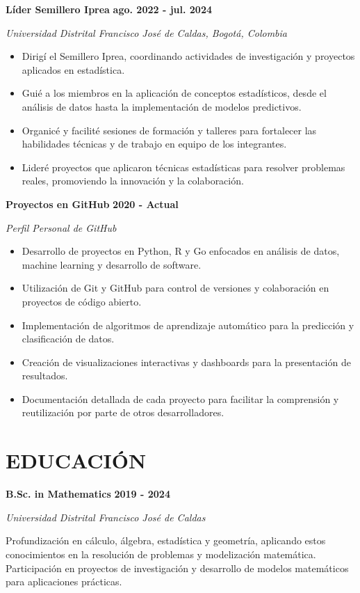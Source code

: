 \documentclass[paper=a4,fontsize=11pt]{scrartcl} %
\newcommand{\sepspace}{\vspace*{0.8em}}
\newcommand{\NewPart}[1]{\section*{\uppercase{#1}}}
\newcommand{\EducationEntry}[4]{%
  \noindent \textbf{#1} \hfill \textbf{#2} \par
  \noindent \textit{#3} \par
  \noindent \small #4 
  \normalsize \par \sepspace
}
\newcommand{\WorkEntry}[4]{%
  \noindent \textbf{#1} \hfill \textbf{#2} \par
  \noindent \textit{#3} \par
  \noindent \small #4 
  \normalsize \par \sepspace
}
\begin{document}
\WorkEntry{Líder Semillero Iprea}{ago. 2022 - jul. 2024}{Universidad Distrital Francisco José de Caldas, Bogotá, Colombia}{%
\begin{itemize}[leftmargin=*, noitemsep]
    \item Dirigí el Semillero Iprea, coordinando actividades de investigación y proyectos aplicados en estadística.
    \item Guié a los miembros en la aplicación de conceptos estadísticos, desde el análisis de datos hasta la implementación de modelos predictivos.
    \item Organicé y facilité sesiones de formación y talleres para fortalecer las habilidades técnicas y de trabajo en equipo de los integrantes.
    \item Lideré proyectos que aplicaron técnicas estadísticas para resolver problemas reales, promoviendo la innovación y la colaboración.
\end{itemize}
}

\WorkEntry{Proyectos en GitHub}{2020 - Actual}{Perfil Personal de GitHub}{%
\begin{itemize}[leftmargin=*, noitemsep]
    \item Desarrollo de proyectos en Python, R y Go enfocados en análisis de datos, machine learning y desarrollo de software.
    \item Utilización de Git y GitHub para control de versiones y colaboración en proyectos de código abierto.
    \item Implementación de algoritmos de aprendizaje automático para la predicción y clasificación de datos.
    \item Creación de visualizaciones interactivas y dashboards para la presentación de resultados.
    \item Documentación detallada de cada proyecto para facilitar la comprensión y reutilización por parte de otros desarrolladores.
\end{itemize}
}

\sepspace

\NewPart{Educación}

\EducationEntry{B.Sc. in Mathematics}{2019 - 2024}{Universidad Distrital Francisco José de Caldas}{%
Profundización en cálculo, álgebra, estadística y geometría, aplicando estos conocimientos en la resolución de problemas y modelización matemática. Participación en proyectos de investigación y desarrollo de modelos matemáticos para aplicaciones prácticas.
}
\end{document}
